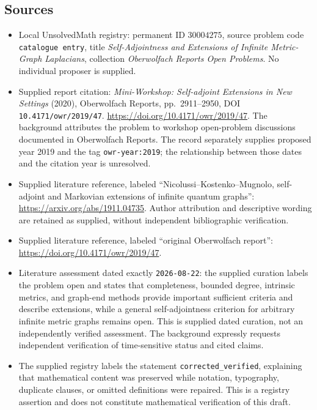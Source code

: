 \documentclass[11pt]{article}
\begin{document}
\subsection{Sources}
\begin{itemize}
\item Local UnsolvedMath registry: permanent ID \(30004275\), source problem code \texttt{catalogue entry}, title \emph{Self-Adjointness and Extensions of Infinite Metric-Graph Laplacians}, collection \emph{Oberwolfach Reports Open Problems}. No individual proposer is supplied.
\item Supplied report citation: \emph{Mini-Workshop: Self-adjoint Extensions in New Settings} (2020), Oberwolfach Reports, pp.\ 2911--2950, DOI \texttt{10.4171/owr/2019/47}. \url{https://doi.org/10.4171/owr/2019/47}. The background attributes the problem to workshop open-problem discussions documented in Oberwolfach Reports. The record separately supplies proposed year 2019 and the tag \texttt{owr-year:2019}; the relationship between those dates and the citation year is unresolved.
\item Supplied literature reference, labeled ``Nicolussi--Kostenko--Mugnolo, self-adjoint and Markovian extensions of infinite quantum graphs'': \url{https://arxiv.org/abs/1911.04735}. Author attribution and descriptive wording are retained as supplied, without independent bibliographic verification.
\item Supplied literature reference, labeled ``original Oberwolfach report'': \url{https://doi.org/10.4171/owr/2019/47}.
\item Literature assessment dated exactly \texttt{2026-08-22}: the supplied curation labels the problem open and states that completeness, bounded degree, intrinsic metrics, and graph-end methods provide important sufficient criteria and describe extensions, while a general self-adjointness criterion for arbitrary infinite metric graphs remains open. This is supplied dated curation, not an independently verified assessment. The background expressly requests independent verification of time-sensitive status and cited claims.
\item The supplied registry labels the statement \texttt{corrected\_verified}, explaining that mathematical content was preserved while notation, typography, duplicate clauses, or omitted definitions were repaired. This is a registry assertion and does not constitute mathematical verification of this draft.
\end{itemize}
\end{document}
